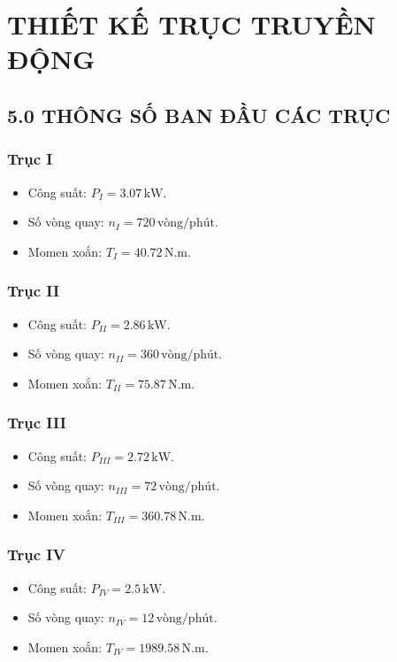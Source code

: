 \chapter{THIẾT KẾ TRỤC TRUYỀN ĐỘNG}
    \section*{5.0 THÔNG SỐ BAN ĐẦU CÁC TRỤC}
        \subsection{Trục I}
            \begin{itemize}
                \item Công suất: $P_{I} = 3.07 \, \mathrm{kW}$.
                \item Số vòng quay: $n_{I} = 720 \, \mathrm{vòng/phút}$.
                \item Momen xoắn: $T_{I} = 40.72 \, \mathrm{N.m}$.
            \end{itemize}
        \subsection{Trục II}
            \begin{itemize}
                \item Công suất: $P_{II} = 2.86 \, \mathrm{kW}$.
                \item Số vòng quay: $n_{II} = 360 \, \mathrm{vòng/phút}$.
                \item Momen xoắn: $T_{II} = 75.87 \, \mathrm{N.m}$.
            \end{itemize}
        \subsection{Trục III}
            \begin{itemize}
                \item Công suất: $P_{III} = 2.72 \, \mathrm{kW}$.
                \item Số vòng quay: $n_{III} = 72 \, \mathrm{vòng/phút}$.
                \item Momen xoắn: $T_{III} = 360.78 \, \mathrm{N.m}$.
            \end{itemize}
        \subsection{Trục IV}
            \begin{itemize}
                \item Công suất: $P_{IV} = 2.5 \, \mathrm{kW}$.
                \item Số vòng quay: $n_{IV} = 12 \, \mathrm{vòng/phút}$.
                \item Momen xoắn: $T_{IV} = 1989.58 \, \mathrm{N.m}$.
            \end{itemize}
